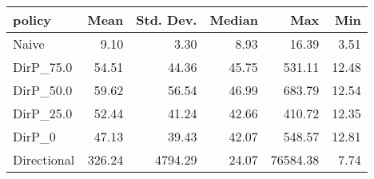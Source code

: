 \begin{tabular}{lrrrrr}
\toprule
     policy &   Mean &  Std. Dev. &  Median &      Max &   Min \\
\midrule
      Naive &   9.10 &       3.30 &    8.93 &    16.39 &  3.51 \\
  DirP\_75.0 &  54.51 &      44.36 &   45.75 &   531.11 & 12.48 \\
  DirP\_50.0 &  59.62 &      56.54 &   46.99 &   683.79 & 12.54 \\
  DirP\_25.0 &  52.44 &      41.24 &   42.66 &   410.72 & 12.35 \\
     DirP\_0 &  47.13 &      39.43 &   42.07 &   548.57 & 12.81 \\
Directional & 326.24 &    4794.29 &   24.07 & 76584.38 &  7.74 \\
\bottomrule
\end{tabular}
